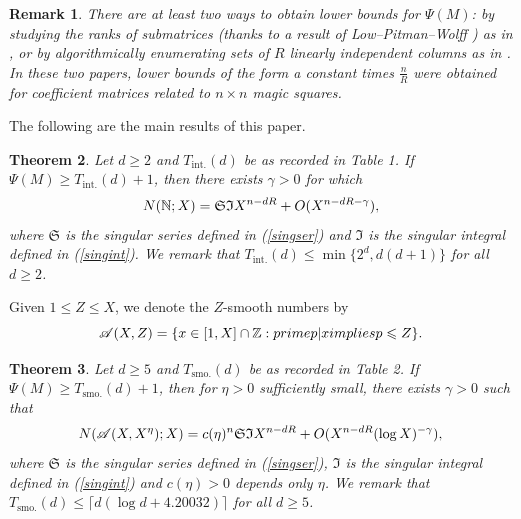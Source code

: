 \documentclass[reqno, 12pt, reqno]{amsart}
\numberwithin{equation}{section}
\newtheorem{theorem}{Theorem}[section]
\newtheorem{remark}[theorem]{Remark}
\newcommand{\ZZ}{\mathbb{Z}}
\newcommand{\NN}{\mathbb{N}}
\renewcommand{\leq}{\leqslant}
\renewcommand{\geq}{\geqslant}
\renewcommand{\=}{\equiv}
\begin{document}
\begin{remark}
There are at least two ways to obtain lower bounds for $\Psi(M)$: by studying the ranks of submatrices (thanks to a result of Low--Pitman--Wolff \cite[Lemma 1]{LPW}) as in \cite{flores}, or by algorithmically enumerating sets of $R$ linearly independent columns as in \cite{msos}. In these two papers,
lower bounds of the form a constant times $\frac{n}{R}$ were obtained for coefficient matrices related to $n \times n$ magic squares.
\end{remark}

The following are the main results of this paper.
\begin{theorem}
\label{main2}
Let $d \geq 2$ and  $T_{\text{int.}}(d)$ be as recorded in Table 1.
If $\Psi(M) \geq T_{\text{int.}}(d) + 1$,
then there exists $\gamma > 0$ for which
\begin{eqnarray}
\notag
N(\NN; X) =  \mathfrak{S} \mathfrak{I} X^{n - d R} + O(  X^{n  - d R - \gamma} ),
\end{eqnarray}
where $\mathfrak{S}$ is the singular series defined in (\ref{singser}) and $\mathfrak{I}$ is the singular integral defined in (\ref{singint}).
We remark that $T_{\text{int.}}(d) \leq \min \{2^d, d(d+1) \}$ for all $d \geq 2$.
\end{theorem}


Given $1 \leq Z \leq X$, we denote the $Z$-smooth numbers by
$$
\mathcal{A}(X, Z) = \{ x \in [1, X] \cap \ZZ: \textnormal{prime } p| x \textnormal{ implies } p \leq Z  \}.
$$

\begin{theorem}
\label{main2+}
Let $d \geq 5$ and $T_{\text{smo.}}(d)$ be as recorded in Table 2.
If $\Psi(M) \geq T_{\text{smo.}}(d) + 1$, then for $\eta > 0$ sufficiently small, there exists $\gamma > 0$ such that
\begin{eqnarray}
\notag
N(\mathcal{A}(X, X^{\eta}) ; X) = c(\eta)^n \mathfrak{S} \mathfrak{I} X^{n - d R} + O(  X^{n  - d R} (\log X)^{ - \gamma} ),
\end{eqnarray}
where $\mathfrak{S}$ is the singular series defined in (\ref{singser}), $\mathfrak{I}$ is the singular integral defined in (\ref{singint})
and $c(\eta) > 0$ depends only $\eta$. We remark that $T_{\text{smo.}}(d) \leq  \lceil d(\log d + 4.20032)\rceil$ for all $d \geq 5$.
\end{theorem}
\end{document}
